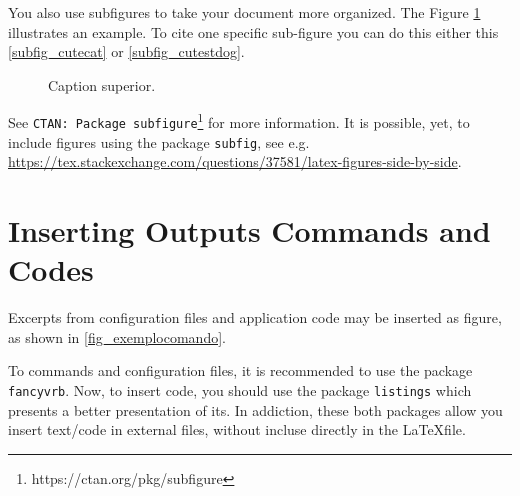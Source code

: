 You also use subfigures to take your document more organized. The Figure \ref{fig_subfigname} illustrates an example. To cite one specific  sub-figure you can do this either this \ref{subfig_cutecat} or \ref{subfig_cutestdog}.

\begin{figure}[!ht]
    \centering
    \caption{Caption superior.}
        \qquad
    \label{fig_subfigname}
\end{figure}


See \texttt{CTAN: Package subfigure}\footnote{https://ctan.org/pkg/subfigure} for more information. It is possible, yet, to include figures using the package \texttt{subfig}, see e.g. \url{https://tex.stackexchange.com/questions/37581/latex-figures-side-by-side}.

\section{Inserting Outputs Commands and Codes}

Excerpts from configuration files and application code may be inserted as figure, as shown in \ref{fig_exemplocomando}. 

To commands and configuration files, it is recommended to use the package \texttt{fancyvrb}. Now, to insert code, you should use the package \texttt{listings} which presents a better presentation of its. In addiction, these both packages allow you insert text/code in external files, without incluse directly in the \LaTeX file.

